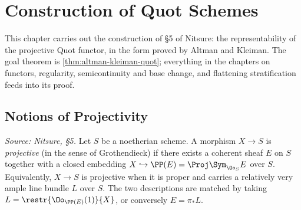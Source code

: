 \chapter{Construction of Quot Schemes}
\label{chap:quot-construction}

This chapter carries out the construction of \S5 of Nitsure: the
representability of the projective Quot functor, in the form proved by
Altman and Kleiman. The goal theorem is
\cref{thm:altman-kleiman-quot}; everything in the chapters on functors,
regularity, semicontinuity and base change, and flattening stratification
feeds into its proof.

\bigskip
\section*{Notions of Projectivity}
\medskip

\begin{definition}
  \label{def:projective-morphism}
  \textit{Source: Nitsure, §5.}
  Let $S$ be a noetherian scheme. A morphism $X \to S$ is \emph{projective}
  (in the sense of Grothendieck) if there exists a coherent sheaf $E$ on $S$
  together with a closed embedding $X \hookrightarrow \PP(E) = \Proj \Sym_{\Oo_S} E$
  over $S$. Equivalently, $X \to S$ is projective when it is proper and carries
  a relatively very ample line bundle $L$ over $S$. The two descriptions are
  matched by taking $L = \restr{\Oo_{\PP(E)}(1)}{X}$, or conversely $E = \pi_* L$.
\end{definition}

